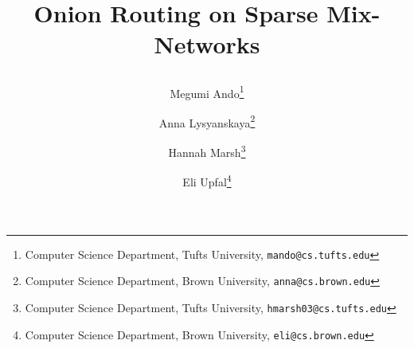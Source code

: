 \newif \iftheory 

\theorytrue %

\newif \ifblind

\blindtrue \blindfalse

\newcommand{\eli}[1]{\textcolor{blue}{[Eli: #1]}}
\newcommand{\meg}[1]{\textcolor{red}{[Megumi: #1]}}
\newcommand{\hannah}[1]{\textcolor{magenta}{[Hannah: #1]}}


\newcommand{\authorlist}{
Megumi Ando\iftheory\thanks{Computer Science Department, Tufts University, {\tt mando@cs.tufts.edu}}\fi
\and 
Anna Lysyanskaya\iftheory\thanks{Computer Science Department, Brown University, {\tt anna@cs.brown.edu}}\fi
\and 
Hannah Marsh\iftheory\thanks{Computer Science Department, Tufts University, {\tt hmarsh03@cs.tufts.edu}}\fi
\and
Eli Upfal\iftheory\thanks{Computer Science Department, Brown University, {\tt eli@cs.brown.edu}}\fi
}

\newcommand{\institutelist}{}


\newcommand{\titlelist}{\iftheory\begin{bf}\fi
Onion Routing on Sparse Mix-Networks
\iftheory\end{bf}\fi}

\newcommand{\pathstyles}{./stylefiles}

\newcommand{\pathpreambles}{./preambles}

\newcommand{\pathbibs}{./bibfiles}



\iftheory
\documentclass[11pt]{article}

\else
\documentclass[runningheads,a4paper]{llncs}
\ifblind 
\institute{}
\else
\institute{\institutelist}
\fi
\fi

\ifblind 
\author{}
\else
\author{\authorlist} 
\fi
\pagestyle{plain}

\title{\titlelist}






\iftheory
\newpage
\thispagestyle{empty}
\tableofcontents
\newpage
\setcounter{page}{1}
\fi

\newcommand{\parties}{\mathsf{Parties}}
\newcommand{\keygen}{\mathsf{KeyGen}}
\newcommand{\formonion}{\mathsf{FormOnion}}
\newcommand{\proconion}{\mathsf{PeelOnion}}
\newcommand{\proconionhelper}{\mathsf{PeelOnionHelper}}
\newcommand{\bruiseonion}{\mathsf{BruiseOnion}}
\newcommand{\polylog}{\mathsf{polylog}}
\newcommand{\early}{\mathsf{early}}
\newcommand{\late}{\mathsf{late}}
\newcommand{\recipient}{\mathsf{Recipient}}
\newcommand{\Bad}{\mathsf{Bad}}

